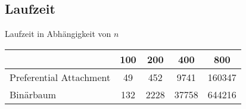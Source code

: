 \subsection{Laufzeit}

\begin{frame}{Laufzeit in Abhängigkeit von $n$}
    \begin{table}
        \centering
        \begin{tabular}{l*{4}{c}}
            \toprule
            & 100 & 200 & 400 & 800 \\
            \midrule
            Preferential Attachment & 49 & 452 & 9741 & 160347 \\
            Binärbaum & 132 & 2228 & 37758 & 644216 \\ 
            \bottomrule
        \end{tabular}
    \end{table}
\end{frame}

